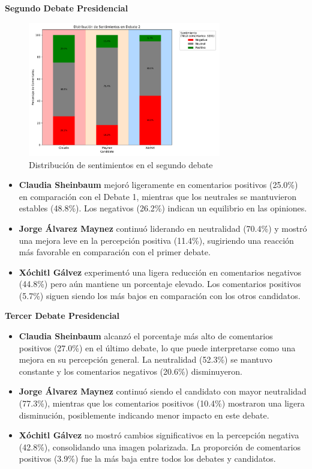 \documentclass[10pt, a4paper]{article}
\begin{document}
	
	
	\textbf{Segundo Debate Presidencial}
	\begin{figure}[H] %
		\centering
		\includegraphics[width=0.75\textwidth]{sA_debate2.pdf} %
		\caption{Distribución de sentimientos en el segundo debate} %
		\label{fig:sA_debate2} %
	\end{figure}
	\begin{itemize}
		\item \textbf{Claudia Sheinbaum} mejoró ligeramente en comentarios positivos (25.0\%) en comparación con el Debate 1, mientras que los neutrales se mantuvieron estables (48.8\%). Los negativos (26.2\%) indican un equilibrio en las opiniones.
		\item \textbf{Jorge Álvarez Maynez} continuó liderando en neutralidad (70.4\%) y mostró una mejora leve en la percepción positiva (11.4\%), sugiriendo una reacción más favorable en comparación con el primer debate.
		\item \textbf{Xóchitl Gálvez} experimentó una ligera reducción en comentarios negativos (44.8\%) pero aún mantiene un porcentaje elevado. Los comentarios positivos (5.7\%) siguen siendo los más bajos en comparación con los otros candidatos.
	\end{itemize}
	
	
	
	\textbf{Tercer Debate Presidencial}
	\begin{itemize}
		\item \textbf{Claudia Sheinbaum} alcanzó el porcentaje más alto de comentarios positivos (27.0\%) en el último debate, lo que puede interpretarse como una mejora en su percepción general. La neutralidad (52.3\%) se mantuvo constante y los comentarios negativos (20.6\%) disminuyeron.
		\item \textbf{Jorge Álvarez Maynez} continuó siendo el candidato con mayor neutralidad (77.3\%), mientras que los comentarios positivos (10.4\%) mostraron una ligera disminución, posiblemente indicando menor impacto en este debate.
		\item \textbf{Xóchitl Gálvez} no mostró cambios significativos en la percepción negativa (42.8\%), consolidando una imagen polarizada. La proporción de comentarios positivos (3.9\%) fue la más baja entre todos los debates y candidatos.
	\end{itemize}
	
\end{document}
